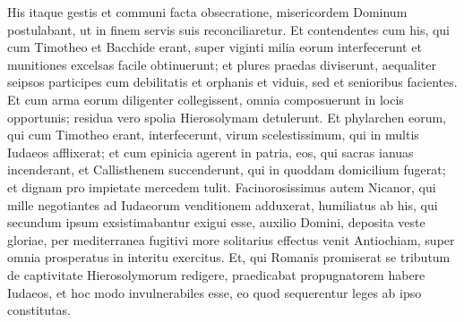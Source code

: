 \begin{biblechapter}
\verse His itaque gestis et communi facta obsecratione, misericordem Dominum postulabant, ut in finem servis suis reconciliaretur. 
\verse Et contendentes cum his, qui cum Timotheo et Bacchide erant, super viginti milia eorum interfecerunt et munitiones excelsas facile obtinuerunt; et plures praedas diviserunt, aequaliter seipsos participes cum debilitatis et orphanis et viduis, sed et senioribus facientes. 
\verse Et cum arma eorum diligenter collegissent, omnia composuerunt in locis opportunis; residua vero spolia Hierosolymam detulerunt. 
\verse Et phylarchen eorum, qui cum Timotheo erant, interfecerunt, virum scelestissimum, qui in multis Iudaeos afflixerat; 
\verse et cum epinicia agerent in patria, eos, qui sacras ianuas incenderant, et Callisthenem succenderunt, qui in quoddam domicilium fugerat; et dignam pro impietate mercedem tulit. 
\verse Facinorosissimus autem Nicanor, qui mille negotiantes ad Iudaeorum venditionem adduxerat, 
\verse humiliatus ab his, qui secundum ipsum exsistimabantur exigui esse, auxilio Domini, deposita veste gloriae, per mediterranea fugitivi more solitarius effectus venit Antiochiam, super omnia prosperatus in interitu exercitus. 
\verse Et, qui Romanis promiserat se tributum de captivitate Hierosolymorum redigere, praedicabat propugnatorem habere Iudaeos, et hoc modo invulnerabiles esse, eo quod sequerentur leges ab ipso constitutas. 
\end{biblechapter}

